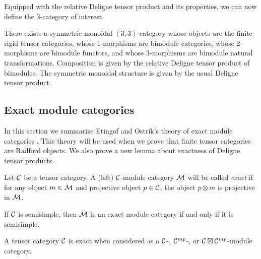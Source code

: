 \documentclass{amsart}
\begin{document}
Equipped with the relative Deligne tensor product and its properties, we can now define the 3-category of interest.

\begin{maintheorem}[\cite{3TC}]
	There exists a symmetric monoidal $(3,3)$-category whose objects are the finite rigid tensor categories, whose 1-morphisms are bimodule categories, whose 2-morphisms are bimodule functors, and whose 3-morphisms are bimodule natural transformations. Composition is given by the relative Deligne tensor product of bimodules. The symmetric monoidal structure is given by the usual Deligne tensor product. 
\end{maintheorem}

\subsection{Exact module categories} \label{sec:tc-exact}
In this section we summarize Etingof and Ostrik's theory of exact module categories \cite{EO-ftc}.  This theory will be used when we prove that finite tensor categories are Radford objects.   We also prove a new lemma about exactness of Deligne tensor products.

\begin{definition}
	Let $\mathcal C$ be a tensor category. A (left) $\mathcal C$-module category $\mathcal M$ will be called {\em exact} if for any object $m \in \mathcal M$ and  projective object $p \in \mathcal C$, the object $p \otimes m$ is projective in $\mathcal M$. 
\end{definition}

\begin{example}
	If $\mathcal C$ is semisimple, then $\mathcal M$ is an exact module category if and only if it is semisimple.
\end{example}

\begin{example} \label{ex:exactness}
	A tensor category $\mathcal C$ is exact when considered as a $\mathcal C$-, $\mathcal C^{mp}$-, or $\mathcal C \boxtimes \mathcal C^{mp}$-module category. 
\end{example}
\end{document}
